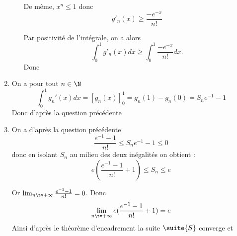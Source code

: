 \documentclass[a4paper, 11pt,reqno]{article}
\begin{document}
\begin{correction}
\begin{enumerate}
\begin{enumerate}
De même, $x^n\leq 1 $ donc 
$$g'_n(x) \geq \frac{-e^{-x}}{n!}
$$

Par positivité de l'intégrale, on a alors 
$$\int_0^1 g'_n(x) dx \geq \int_0^1 \frac{-e^{-x}}{n!}dx.$$
Donc 
\end{enumerate}
\item On a pour tout $n\in \N$
$$\int_0^1g_n'(x) dx = [g_n(x)]_0^1 =g_n(1)-g_n(0) = S_ne^{-1} -1$$
Donc d'après la question précédente 

\item On  a d'après la question précédente
$$\frac{e^{-1}-1}{n!}\leq S_ne^{-1} -1\leq 0$$
donc en isolant $S_n$ au milieu des deux inégalités on obtient :  
$$e(\frac{e^{-1}-1}{n!}+1)\leq S_n\leq e$$



Or 
$\lim_{n\tv +\infty} \frac{e^{-1}-1}{n!}=0$. Donc
$$\lim_{n\tv +\infty} e(\frac{e^{-1}-1}{n!}+1)=e$$
Ainsi d'après le théorème d'encadrement la suite $\suite{S}$ converge et 



\end{enumerate}

\end{correction}
\end{document}
